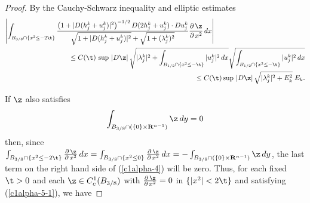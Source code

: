 \documentclass[a4paper,11pt]{amsart}
\begin{document}
\begin{proof}
By the Cauchy-Schwarz inequality and elliptic estimates 
\begin{eqnarray}\label{c1alpha-5}
\left|\int_{B_{3/8} \cap \{x^{2} \leq -2\t\}} \frac{\left(1 + |D(h_{j}^{k} + u_{j}^{k})|^{2}\right)^{-1/2}D(2h_{j}^{k} + u_{j}^{k}) \cdot Du_{j}^{k}}{\sqrt{1 + |D(h_{j}^{k} + u_{j}^{k})|^{2}} + \sqrt{1 + (\lambda_{j}^{k})^{2}}} \frac{\partial \, \z}{\partial \, x^{2}}\, dx\right|&&\nonumber\\
&&\hspace{-3in}\leq C(\t) \, \sup \, |D\z|\, \sqrt{|\lambda_{j}^{k}|^{2} +\int_{B_{1/2} \cap \{x^{2} \leq -\t\}} |u_{j}^{k}|^{2} \, dx}
\sqrt{ \int_{B_{1/2} \cap \{x^{2} \leq -\t\}} |u_{j}^{k}|^{2} \, dx}\nonumber\\
&&\hspace{-2in}\leq C(\t) \sup \, |D\z| \, \sqrt{|\lambda_{j}^{k}|^{2} + E_{k}^{2}} \; E_{k}.
\end{eqnarray}


If $\z$ also satisfies 
\begin{equation}\label{c1alpha-5-1}
\int_{B_{3/8} \cap (\{0\} \times {\mathbf R}^{n-1})} \z \, dy = 0
\end{equation}
then, since $\int_{B_{3/8} \cap \{x^{2} \leq -2\t\}} \frac{\partial \, \z}{\partial \, x^{2}} \, dx = \int_{B_{3/8} \cap \{x^{2} \leq 0\}} 
\frac{\partial \, \z}{\partial \, x^{2}} \, dx = -\int_{B_{3/8} \cap (\{0\} \times {\mathbf R}^{n-1})} \z \, dy$, the last term on the right hand side of (\ref{c1alpha-4}) will be zero. Thus, for each fixed $\t >0$ and 
each $\z \in C^{1}_{c}(B_{3/8})$ with $\frac{\partial \, \z}{\partial \,x^{2}} = 0$ in $\{|x^{2}| < 2\t\}$ and satisfying 
(\ref{c1alpha-5-1}), we have  


\end{proof}
\end{document}
